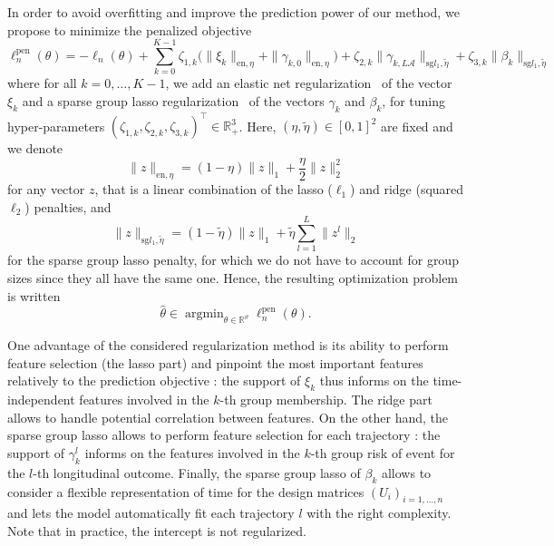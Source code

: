 \documentclass[11pt]{article}
\DeclareMathOperator{\argmin}{argmin}
\newcommand{\norm}[1]{\|#1\|}
\newcommand{\cA}{\mathcal A}
\newcommand{\R}{\mathds R}
\begin{document}
In order to avoid overfitting and improve the prediction power of our method, we propose to minimize the penalized objective
\begin{equation}
  \label{eq:pen-log-lik}
	\ell_n^\text{pen}(\theta) = - \ell_n(\theta) + \sum_{k=0}^{K-1} \zeta_{1,k} \big(\norm{\xi_k}_{\text{en}, \eta} + \norm{\gamma_{k,0}}_{\text{en}, \eta}\big) + \zeta_{2,k} \norm{\gamma_{k,L\cA}}_{\text{sg} l_1, \tilde{\eta}} + \zeta_{3,k} \norm{\beta_k}_{\text{sg} l_1, \tilde{\eta}}
\end{equation}
where for all $k=0, \ldots, K-1$, we add an elastic net regularization~\citep{zou2005regularization} of the vector $\xi_k$ and a sparse group lasso regularization~\citep{simon2013sparse} of the vectors $\gamma_k$ and $\beta_k$, for tuning hyper-parameters $(\zeta_{1,k}, \zeta_{2,k}, \zeta_{3,k})^\top \in \R_+^3$. Here, $(\eta, \tilde{\eta}) \in [0, 1]^2$ are fixed and we denote
\[ \norm{z}_{\text{en}, \eta} = (1-\eta)\norm{z}_1 + \dfrac\eta2 \norm{z}_2^2 \]
for any vector $z$, that is a linear combination of the lasso ($\ell_1$) and ridge (squared $\ell_2$) penalties, and
\[ \norm{z}_{\text{sg} l_1, \tilde{\eta}} = (1-\tilde{\eta})\norm{z}_1 + \tilde{\eta} \sum_{l=1}^L\norm{z^l}_2 \] for the sparse group lasso penalty, for which we do not have to account for group sizes since they all have the same one. 
Hence, the resulting optimization problem is written
\begin{equation}
  \label{eq:optim-pb}
   \hat \theta \in \argmin_{\theta \in \R^\vartheta} \ell_n^\text{pen}(\theta).
 \end{equation}

One advantage of the considered regularization method is its ability to perform feature selection (the lasso part) and pinpoint the most important features relatively to the prediction objective : the support of $\xi_k$ thus informs on the time-independent features involved in the $k$-th group membership. The ridge part allows to handle potential correlation between features.
On the other hand, the sparse group lasso allows to perform feature selection for each trajectory : the support of $\gamma_k^l$ informs on the features involved in the $k$-th group risk of event for the $l$-th longitudinal outcome.
Finally, the sparse group lasso of $\beta_k$ allows to consider a flexible representation of time for the design matrices $(U_i)_{i=1, \dots, n}$ and lets the model automatically fit each trajectory $l$ with the right complexity.
Note that in practice, the intercept is not regularized.
\end{document}
